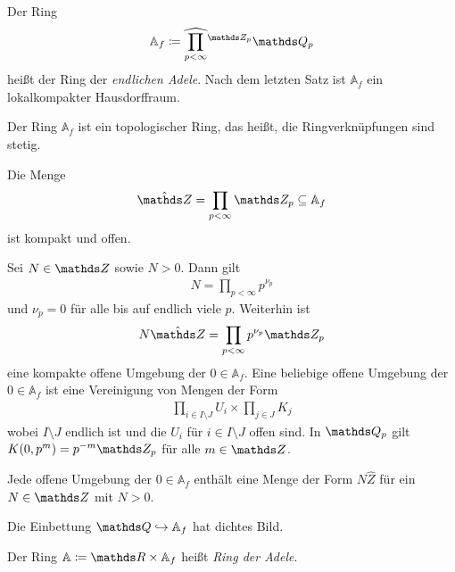 \begin{defi}
Der Ring
\begin{align*}
\mathbb{A}_f \coloneqq \widehat{\prod_{p<\infty}}\vphantom{\prod}^{\Z_p} \Q_p
\end{align*}
heißt der Ring der \emph{endlichen Adele}.
Nach dem letzten Satz ist $\mathbb{A}_f$ ein lokalkompakter Hausdorffraum.
\end{defi}


\begin{prop}
Der Ring $\mathbb{A}_f$ ist ein topologischer Ring, das heißt, die Ringverknüpfungen sind stetig.
\end{prop}

\begin{prop}
Die Menge
\begin{align*}
\hat{\Z}=\prod_{p <\infty} \Z_p \subseteq \mathbb{A}_f
\end{align*}
ist kompakt und offen.
\end{prop}

Sei $N\in \Z$ sowie $N>0$. Dann gilt
\begin{align*}
N=\prod_{p<\infty} p^{\nu_p}
\end{align*}
und $\nu_p=0$ für alle bis auf endlich viele $p$.
Weiterhin ist
\begin{align*}
N \hat{\Z}=\prod_{p <\infty} p^{\nu_p}\Z_p
\end{align*}
eine kompakte offene Umgebung der $0 \in \mathbb{A}_f$.
Eine beliebige offene Umgebung der $0 \in \mathbb{A}_f$ ist eine Vereinigung von Mengen der Form
\begin{align*}
\prod_{i \in I\setminus J} U_i \times \prod_{j \in J} K_j
\end{align*}
wobei $I\setminus J$ endlich ist und die $U_i$ für $i \in I \setminus J$ offen sind.
In $\Q_p$ gilt $K(0,p^m)=p^{-m}\Z_p$ für alle $m \in \Z$.

\begin{prop}
Jede offene Umgebung der $0\in \mathbb{A}_f$ enthält eine Menge der Form $N \hat{Z}$ für ein $N \in \Z$ mit $N>0$.
\end{prop}

\begin{prop}
Die Einbettung $\Q \hookrightarrow \mathbb{A}_f$ hat dichtes Bild.
\end{prop}

\begin{defi}
Der Ring $\mathbb{A} \coloneqq \R \times \mathbb{A}_f$ heißt \emph{Ring der Adele}.
\end{defi}

